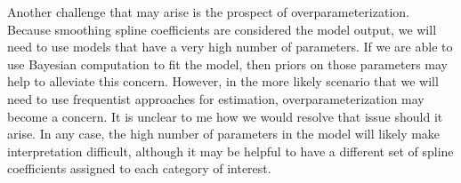 \documentclass[11pt, reqno]{article}
\begin{document}
Another challenge that may arise is the prospect of overparameterization. Because smoothing spline coefficients are considered the model output, we will need to use models that have a very high number of parameters. If we are able to use Bayesian computation to fit the model, then priors on those parameters may help to alleviate this concern. However, in the more likely scenario that we will need to use frequentist approaches for estimation, overparameterization may become a concern. It is unclear to me how we would resolve that issue should it arise. In any case, the high number of parameters in the model will likely make interpretation difficult, although it may be helpful to have a different set of spline coefficients assigned to each category of interest.

\nocite{*}
\printbibliography
\end{document}
